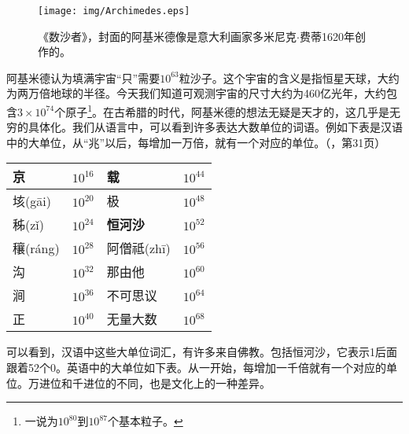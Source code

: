 \documentclass{article}
\begin{document}
\begin{figure}[htbp]
 \centering
 \texttt{[image: img/Archimedes.eps]}
 \captionsetup{labelformat=empty}
 \caption{《数沙者》，封面的阿基米德像是意大利画家多米尼克$\cdot$费蒂1620年创作的。}
 \label{fig:Archimedes}
\end{figure}

阿基米德认为填满宇宙“只”需要$10^{63}$粒沙子。这个宇宙的含义是指恒星天球，大约为两万倍地球的半径。今天我们知道可观测宇宙的尺寸大约为460亿光年，大约包含$3 \times 10^{74}$个原子\footnote{一说为$10^{80}$到$10^{87}$个基本粒子。}。在古希腊的时代，阿基米德的想法无疑是天才的，这几乎是无穷的具体化。我们从语言中，可以看到许多表达大数单位的词语。例如下表是汉语中的大单位，从“兆”以后，每增加一万倍，就有一个对应的单位。（\cite{Noguchi2007}，第31页）

\begin{center}
\begin{tabular}{|l|r|l|r|}
\hline
京            & $10^{16}$ & 载            & $10^{44}$ \\
\hline
垓(g\={a}i)   & $10^{20}$ & 极            & $10^{48}$ \\
\hline
秭(z\v{i})    & $10^{24}$ & \textbf{恒河沙}  & $10^{52}$ \\
\hline
穰(r\'{a}ng)  & $10^{28}$ & 阿僧祗(zh\={i})  & $10^{56}$ \\
\hline
沟            & $10^{32}$ & 那由他        & $10^{60}$ \\
\hline
涧            & $10^{36}$ & 不可思议      & $10^{64}$ \\
\hline
正            & $10^{40}$ & 无量大数      & $10^{68}$ \\
\hline
\end{tabular}
\end{center}

可以看到，汉语中这些大单位词汇，有许多来自佛教。包括恒河沙，它表示1后面跟着52个0。英语中的大单位如下表。从一开始，每增加一千倍就有一个对应的单位。万进位和千进位的不同，也是文化上的一种差异。
\end{document}

